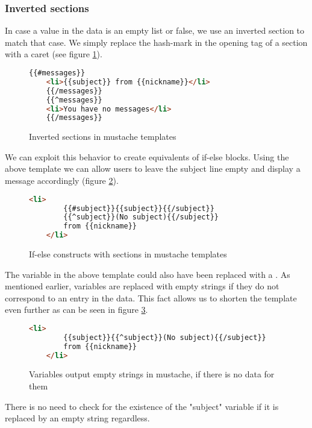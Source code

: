 \subsubsection{Inverted sections}
In case a value in the data is an empty list or false, we use an inverted
section to match that case. We simply replace the hash-mark in the opening tag
of a section with a caret (see figure \ref{fig:inverted.mustache}).
\begin{figure}
	\centering
	\caption{Inverted sections in mustache templates}
	\label{fig:inverted.mustache}
	\begin{lstlisting}[language=HTML]
	{{#messages}}
	<li>{{subject}} from {{nickname}}</li>
	{{/messages}}
	{{^messages}}
	<li>You have no messages</li>
	{{/messages}}
	\end{lstlisting}
\end{figure}

We can exploit this behavior to create equivalents of if-else blocks.
Using the above template we can allow users to leave the subject line empty
and display a message accordingly (figure \ref{fig:ifelse.mustache}).
\begin{figure}
	\centering
	\caption{If-else constructs with sections in mustache templates}
	\label{fig:ifelse.mustache}
	\begin{lstlisting}[language=HTML]
	<li>
		{{#subject}}{{subject}}{{/subject}}
		{{^subject}}(No subject){{/subject}}
		from {{nickname}}
	</li>
	\end{lstlisting}
\end{figure}

The  variable in the above template could also have been
replaced with a . As mentioned earlier, variables are replaced
with empty strings if they do not correspond to an entry in the data.
This fact allows us to shorten the template even further as can be seen in
figure \ref{fig:emptystr.mustache}.
\begin{figure}
	\centering
	\caption{Variables output empty strings in mustache, if there is no data for them}
	\label{fig:emptystr.mustache}
	\begin{lstlisting}[language=HTML]
	<li>
		{{subject}}{{^subject}}(No subject){{/subject}}
		from {{nickname}}
	</li>
	\end{lstlisting}
\end{figure}

There is no need to check for the existence of the "subject" variable if it is
replaced by an empty string regardless.

